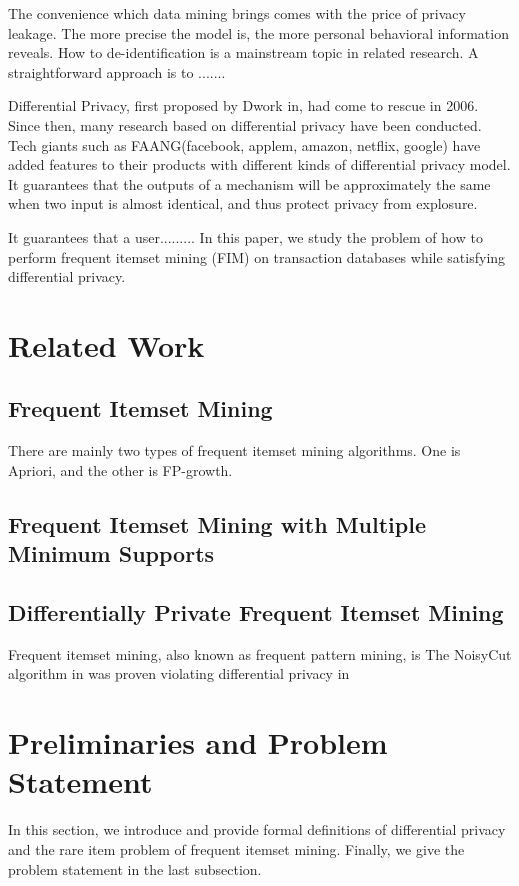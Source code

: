 \documentclass[conference]{IEEEtran}
\begin{document}
The convenience which data mining brings comes with the price of privacy leakage. The more precise the model is, the more personal behavioral information reveals. 
How to de-identification is a mainstream topic in related research.
A straightforward approach is to .......

Differential Privacy, first proposed by Dwork in\cite{b4}, had come to rescue in 2006. 
Since then, many research based on differential privacy have been conducted. Tech giants such as FAANG(facebook, applem, amazon, netflix, google) have added features to their products with different kinds of differential privacy model.
It guarantees that the outputs of a mechanism will be approximately the same when two input is almost identical, and thus protect privacy from explosure. 

It guarantees that a user.........
In this paper, we study the problem of how to perform frequent itemset mining (FIM) on transaction databases while satisfying differential privacy.


\section{Related Work}
\subsection{Frequent Itemset Mining}
There are mainly two types of frequent itemset mining algorithms. 
One is Apriori, and the other is FP-growth. %
\subsection{Frequent Itemset Mining with Multiple Minimum Supports}

\subsection{Differentially Private Frequent Itemset Mining}

Frequent itemset mining, also known as frequent pattern mining, is 
The NoisyCut algorithm in \cite{b8} was proven violating differential privacy in %


\section{Preliminaries and Problem Statement}
In this section, we introduce and provide formal definitions of differential privacy and the rare item problem of frequent itemset mining. 
Finally, we give the problem statement in the last subsection.
\end{document}
